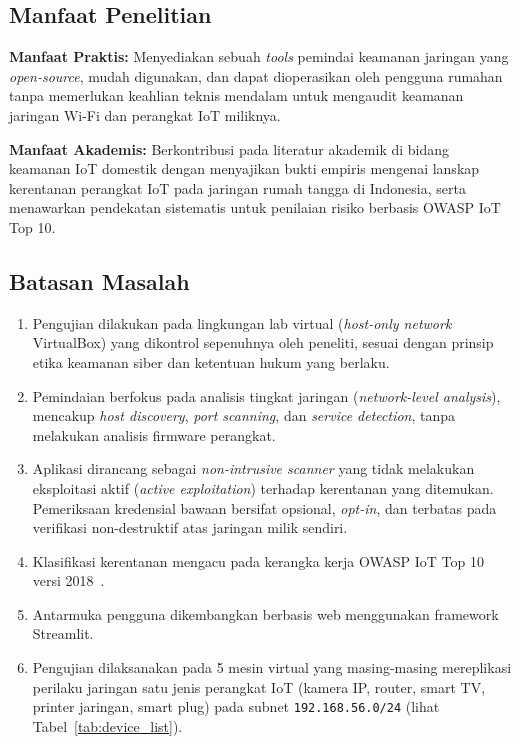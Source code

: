 \documentclass[conference]{IEEEtran}
\begin{document}
\subsection{Manfaat Penelitian}

\textbf{Manfaat Praktis:} Menyediakan sebuah \textit{tools} pemindai keamanan jaringan yang \textit{open-source}, mudah digunakan, dan dapat dioperasikan oleh pengguna rumahan tanpa memerlukan keahlian teknis mendalam untuk mengaudit keamanan jaringan Wi-Fi dan perangkat IoT miliknya.

\textbf{Manfaat Akademis:} Berkontribusi pada literatur akademik di bidang keamanan IoT domestik dengan menyajikan bukti empiris mengenai lanskap kerentanan perangkat IoT pada jaringan rumah tangga di Indonesia, serta menawarkan pendekatan sistematis untuk penilaian risiko berbasis OWASP IoT Top 10.

\subsection{Batasan Masalah}

\begin{enumerate}
    \item Pengujian dilakukan pada lingkungan lab virtual (\textit{host-only network} VirtualBox) yang dikontrol sepenuhnya oleh peneliti, sesuai dengan prinsip etika keamanan siber dan ketentuan hukum yang berlaku.
    \item Pemindaian berfokus pada analisis tingkat jaringan (\textit{network-level analysis}), mencakup \textit{host discovery}, \textit{port scanning}, dan \textit{service detection}, tanpa melakukan analisis firmware perangkat.
    \item Aplikasi dirancang sebagai \textit{non-intrusive scanner} yang tidak melakukan eksploitasi aktif (\textit{active exploitation}) terhadap kerentanan yang ditemukan. Pemeriksaan kredensial bawaan bersifat opsional, \textit{opt-in}, dan terbatas pada verifikasi non-destruktif atas jaringan milik sendiri.
    \item Klasifikasi kerentanan mengacu pada kerangka kerja OWASP IoT Top 10 versi 2018\ \cite{owasp2018}.
    \item Antarmuka pengguna dikembangkan berbasis web menggunakan framework Streamlit.
    \item Pengujian dilaksanakan pada 5 mesin virtual yang masing-masing mereplikasi perilaku jaringan satu jenis perangkat IoT (kamera IP, router, smart TV, printer jaringan, smart plug) pada subnet \texttt{192.168.56.0/24} (lihat Tabel\ \ref{tab:device_list}).
\end{enumerate}
\end{document}
